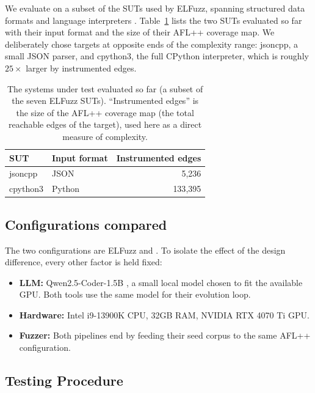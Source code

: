 We evaluate on a subset of the SUTs used by ELFuzz, spanning structured data formats and language interpreters \cite{chen_2025_elfuzz}. Table~\ref{tab:suts} lists the two SUTs evaluated so far with their input format and the size of their AFL++ coverage map. We deliberately chose targets at opposite ends of the complexity range: jsoncpp, a small JSON parser, and cpython3, the full CPython interpreter, which is roughly $25\times$ larger by instrumented edges.

\begin{table}[h]
    \centering
    \begin{tabular}{llr}
        \toprule
        \textbf{SUT} & \textbf{Input format} & \textbf{Instrumented edges} \\
        \midrule
        jsoncpp   & JSON   & 5{,}236 \\
        cpython3  & Python & 133{,}395 \\
        \bottomrule
    \end{tabular}
    \caption{The systems under test evaluated so far (a subset of the seven ELFuzz SUTs). ``Instrumented edges'' is the size of the AFL++ coverage map (the total reachable edges of the target), used here as a direct measure of complexity.}
    \label{tab:suts}
\end{table}

\subsection{Configurations compared}

The two configurations are ELFuzz and \toolname{}. To isolate the effect of the design difference, every other factor is held fixed:

\begin{itemize}
    \item \textbf{LLM:} Qwen2.5-Coder-1.5B \cite{hui_2024_qwen25coder}, a small local model chosen to fit the available GPU. Both tools use the same model for their evolution loop.
    \item \textbf{Hardware:} Intel i9-13900K CPU, 32GB RAM, NVIDIA RTX 4070 Ti GPU.
    \item \textbf{Fuzzer:} Both pipelines end by feeding their seed corpus to the same AFL++ configuration.
\end{itemize}

\subsection{Testing Procedure}
\label{sec:eval-protocol}

